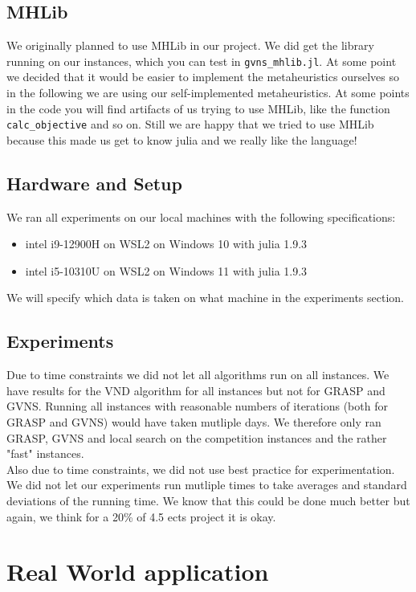 \subsection{MHLib}
We originally planned to use MHLib in our project. We did get the library running on our instances, which you can test in \texttt{gvns\_mhlib.jl}. At some point we decided that it would be easier to implement the metaheuristics ourselves so in the following we are using our self-implemented metaheuristics. At some points in the code you will find artifacts of us trying to use MHLib, like the function \texttt{calc\_objective} and so on. Still we are happy that we tried to use MHLib because this made us get to know julia and we really like the language!\\

\subsection{Hardware and Setup}
We ran all experiments on our local machines with the following specifications:
\begin{itemize}
    \item intel i9-12900H on WSL2 on Windows 10 with julia 1.9.3
    \item intel i5-10310U on WSL2 on Windows 11 with julia 1.9.3
\end{itemize}
We will specify which data is taken on what machine in the experiments section.

\subsection{Experiments}

Due to time constraints we did not let all algorithms run on all instances. We have results for the VND algorithm for all instances but not for GRASP and GVNS. Running all instances with reasonable numbers of iterations (both for GRASP and GVNS) would have taken mutliple days. We therefore only ran GRASP, GVNS and local search on the competition instances and the rather "fast" instances.\\
Also due to time constraints, we did not use best practice for experimentation. We did not let our experiments run mutliple times to take averages and standard deviations of the running time. We know that this could be done much better but again, we think for a 20\% of 4.5 ects project it is okay.

\section{Real World application}

